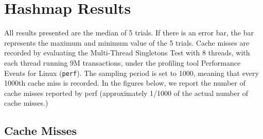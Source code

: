 \chapter{Hashmap Results}
\label{app:hashmaps}

All results presented are the median of 5 trials. If there is an error bar, the bar represents the maximum and minimum value of the 5 trials.
Cache misses are recorded by evaluating the Multi-Thread Singletons Test with 8 threads, with each thread running 9M transactions, under the profiling tool Performance Events for Linux (\texttt{perf}). The sampling period is set to 1000, meaning that every 1000th cache miss is recorded.
In the figures below, we report the number of cache misses reported by perf (approximately 1/1000 of the actual number of cache misses.)

\section{Cache Misses}

